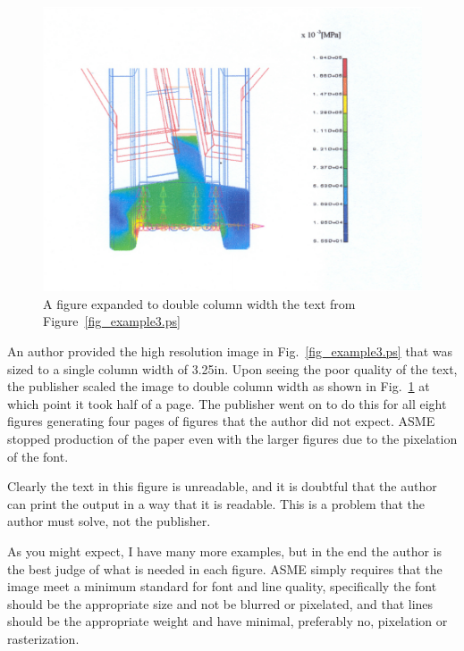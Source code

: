 \documentclass[twocolumn,10pt,journal]{asme2e}
\begin{document}
\begin{figure}
 \centerline{\includegraphics[width=6.85in]{figure/FMANU_MD_04_1274_13}}
 \caption{A figure expanded to double column width the text from Figure~\ref{fig_example3.ps}}
 \label{fig_example4.ps}
\end{figure}
An author provided the high resolution image in Fig.~\ref{fig_example3.ps} that was sized to a single column width of 3.25in.
Upon seeing the poor quality of the text, the publisher scaled the image to double column width as shown in Fig.~\ref{fig_example4.ps} at which point it took half of a page.
The publisher went on to do this for all eight figures generating four pages of figures that the author did not expect.
ASME stopped production of the paper even with the larger figures due to the pixelation of the font.

Clearly the text in this figure is unreadable, and it is doubtful that the author can print the output in a way that it is readable.
This is a problem that the author must solve, not the publisher.

As you might expect, I have many more examples, but in the end the author is the best judge of what is needed in each figure.
ASME simply requires that the image meet a minimum standard for font and line quality, specifically the font should be the appropriate size and not be blurred or pixelated, and that lines should be the appropriate weight and have minimal, preferably no, pixelation or rasterization.
\end{document}
